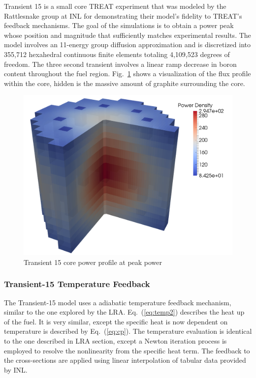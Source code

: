 \documentclass{anstrans}
\newcommand{\eqt}[1]{Eq.~(\ref{#1})}                     %
\newcommand{\fig}[1]{Fig.~\ref{#1}}                      %
\begin{document}
Transient 15 is a small core TREAT experiment that was modeled by the Rattlesnake group at INL for demonstrating their model's fidelity to TREAT's feedback mechanisms. The goal of the simulations is to obtain a power peak whose position and magnitude that sufficiently matches experimental results.  The model involves an 11-energy group diffusion approximation and is discretized into 355,712 hexahedral continuous finite elements totaling 4,109,523 degrees of freedom.  The three second transient involves a linear ramp decrease in boron content throughout the fuel region.  \fig{fig:Tran15} shows a visualization of the flux profile within the core, hidden is the massive amount of graphite surrounding the core.   

\begin{figure}[htbp!]
\centering
\includegraphics[width=\linewidth]{Tran15_core2.png}
\caption{Transient 15 core power profile at peak power}
\label{fig:Tran15}
\end{figure}


\subsubsection{Transient-15 Temperature Feedback}

The Transient-15 model uses a adiabatic temperature feedback mechanism, similar to the one explored by the LRA. \eqt{eq:temp2} describes the heat up of the fuel.  It is very similar, except the specific heat is now dependent on temperature is described by \eqt{eq:cp}.  The temperature evaluation is identical to the one described in LRA section, except a Newton iteration process is employed to resolve the nonlinearity from the specific heat term.  The feedback to the cross-sections are applied using linear interpolation of tabular data provided by INL.
\end{document}
